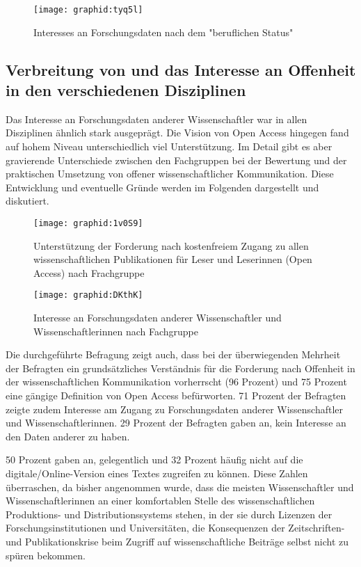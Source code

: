 \begin{figure}[h!]
\texttt{[image: graphid:tyq5l]}
\caption{Interesses an Forschungsdaten nach dem "beruflichen Status"}
\end{figure}

\subsection{Verbreitung von und das Interesse an Offenheit in den verschiedenen Disziplinen}

Das Interesse an Forschungsdaten anderer Wissenschaftler war in allen Disziplinen ähnlich stark ausgeprägt. Die Vision von Open Access hingegen fand auf hohem Niveau unterschiedlich viel Unterstützung. Im Detail gibt es aber gravierende Unterschiede zwischen den Fachgruppen bei der Bewertung und der praktischen Umsetzung von offener wissenschaftlicher Kommunikation. Diese Entwicklung und eventuelle Gründe werden im Folgenden dargestellt und diskutiert.

\begin{figure}[h!]
\texttt{[image: graphid:1v0S9]}
\caption{Unterstützung der Forderung nach kostenfreiem Zugang zu allen wissenschaftlichen Publikationen für Leser und Leserinnen (Open Access) nach Frachgruppe}
\end{figure}

\begin{figure}[h!]
\texttt{[image: graphid:DKthK]}
\caption{Interesse an Forschungsdaten anderer Wissenschaftler und Wissenschaftlerinnen nach Fachgruppe}
\end{figure}

Die durchgeführte Befragung zeigt auch, dass bei der überwiegenden Mehrheit der Befragten ein grundsätzliches Verständnis für die Forderung nach Offenheit in der wissenschaftlichen Kommunikation vorherrscht (96 Prozent) und 75 Prozent eine gängige Definition von Open Access befürworten. 71 Prozent der Befragten zeigte zudem Interesse am Zugang zu Forschungsdaten anderer Wissenschaftler und Wissenschaftlerinnen. 29 Prozent der Befragten gaben an, kein Interesse an den Daten anderer zu haben.

50 Prozent gaben an, gelegentlich und 32 Prozent häufig nicht auf die digitale/Online-Version eines Textes zugreifen zu können. Diese Zahlen überraschen, da bisher angenommen wurde, dass die meisten Wissenschaftler und Wissenschaftlerinnen an einer komfortablen Stelle des wissenschaftlichen Produktions- und Distributionssystems \cite{Herb_2010} stehen, in der sie durch Lizenzen der Forschungsinstitutionen und Universitäten, die Konsequenzen der Zeitschriften- und Publikationskrise beim Zugriff auf wissenschaftliche Beiträge selbst nicht zu spüren bekommen.

